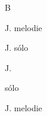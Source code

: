\documentclass[timestamp]{jazzgrid}
\begin{document}
\begin{musicsection}{B}
\barline
	{\barfour{}
		{}
		{}
		{}
		{}
	}
	{\barfour{}
		{}
		{}
		{}
		{}
	}
	{\barfour{}
		{}
		{}
		{}
		{}
	}
	{\barfour{}
		{}
		{}
		{}
		{}
	}
\barline
	{\barfour{}
		{}
		{}
		{}
		{}
	}
	{\barfour{}
		{}
		{}
		{}
		{}
	}
	{\barfour{}
		{}
		{}
		{}
		{}
	}
	{\barfour{}
		{}
		{}
		{}
		{}
	}
\end{musicsection}
\begin{multicols*}{2}
	\begin{description}[noitemsep,align=right,labelwidth=\widthof{\scriptsize\bfseries{A}}]
	\scriptsize
	\item [A] J. melodie
	\item [A] J. sólo
	\item [B] J.
	\item [A] sólo
	\item [A] J. melodie
\end{description}
\end{multicols*}
\end{document}
